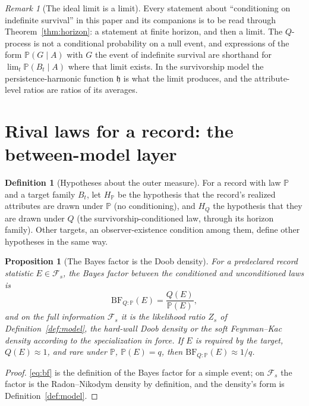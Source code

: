 \documentclass[11pt]{article}
\newcommand{\PP}{\mathbb{P}}
\newcommand{\Fc}{\mathcal{F}}
\newcommand{\hm}{\mathfrak{h}}
\theoremstyle{plain}
\newtheorem{proposition}[theorem]{Proposition}
\theoremstyle{definition}
\newtheorem{definition}[theorem]{Definition}
\theoremstyle{remark}
\newtheorem{remark}[theorem]{Remark}
\begin{document}
\begin{remark}[The ideal limit is a limit]\label{rem:limit}
Every statement about ``conditioning on indefinite survival'' in this
paper and its companions is to be read through Theorem~\ref{thm:horizon}:
a statement at finite horizon, and then a limit. The $Q$-process is not a
conditional probability on a null event, and expressions of the form
$\PP(G\mid A)$ with $G$ the event of indefinite survival are shorthand for
$\lim_t\PP(B_t\mid A)$ where that limit exists. In the survivorship model
the persistence-harmonic function $\hm$ is what the limit produces, and
the attribute-level ratios are ratios of its averages.
\end{remark}

\section{Rival laws for a record: the between-model layer}
\label{sec:models}

\begin{definition}[Hypotheses about the outer measure]\label{def:hyps}
For a record with law $\PP$ and a target family $B_t$, let $H_\PP$ be the
hypothesis that the record's realized attributes are drawn under $\PP$
(no conditioning), and $H_Q$ the hypothesis that they are drawn under
$Q$ (the survivorship-conditioned law, through its horizon family). Other
targets, an observer-existence condition among them, define other
hypotheses in the same way.
\end{definition}

\begin{proposition}[The Bayes factor is the Doob density]\label{prop:bf}
For a predeclared record statistic $E\in\Fc_s$, the Bayes factor between
the conditioned and unconditioned laws is
\begin{equation}\label{eq:bf}
\mathrm{BF}_{Q:\PP}(E)=\frac{Q(E)}{\PP(E)},
\end{equation}
and on the full information $\Fc_s$ it is the likelihood ratio $Z_s$ of
Definition~\ref{def:model}, the hard-wall Doob density or the soft
Feynman--Kac density according to the specialization in force. If $E$ is required by the
target, $Q(E)\approx1$, and rare under $\PP$, $\PP(E)=q$, then
$\mathrm{BF}_{Q:\PP}(E)\approx1/q$.
\end{proposition}

\begin{proof}
\eqref{eq:bf} is the definition of the Bayes factor for a simple event;
on $\Fc_s$ the factor is the Radon--Nikodym density by definition, and the
density's form is Definition~\ref{def:model}.
\end{proof}
\end{document}

